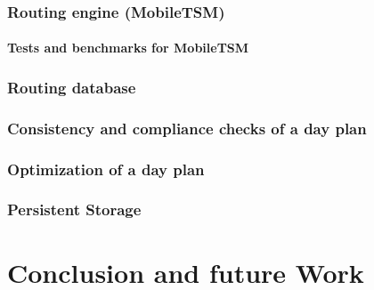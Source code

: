 \documentclass[11pt,a4paper]{scrreprt}
\begin{document}
	\subsection{Routing engine (MobileTSM)} %
	\label{sub:routing_mobiletsm}
	

	\subsubsection{Tests and benchmarks for MobileTSM}
	\label{sub:routing_testcase}
		
		
	\subsection{Routing database} %
	\label{sub:routing_database}
	
			
	\subsection{Consistency and compliance checks of a day plan} %
	\label{sub:dayplan}
		
			
	\subsection{Optimization of a day plan} %
	\label{sub:dayplan_optimization}
	
			
	\subsection{Persistent Storage} %
	\label{sec:android_pers_storage}
	

\chapter{Conclusion and future Work} %
\label{chp:platform_choice}


%
%
\end{document}
